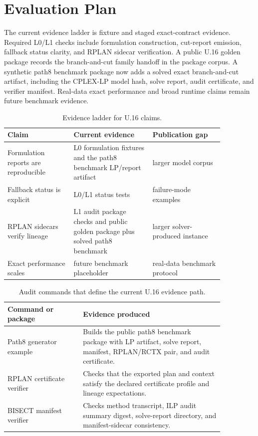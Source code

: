 \section{Evaluation Plan}

The current evidence ladder is fixture and staged exact-contract evidence.
Required L0/L1 checks include formulation construction, cut-report emission,
fallback status clarity, and RPLAN sidecar verification. A public U.16 golden
package records the branch-and-cut family handoff in the package corpus. A
synthetic path8 benchmark package now adds a solved exact branch-and-cut
artifact, including the CPLEX-LP model hash, solve report, audit certificate,
and verifier manifest. Real-data exact performance and broad runtime claims
remain future benchmark evidence.

\begin{table}[htbp]
\centering
\small
\begin{tabular}{p{0.26\linewidth}p{0.31\linewidth}p{0.29\linewidth}}
\toprule
Claim & Current evidence & Publication gap \\
\midrule
Formulation reports are reproducible & L0 formulation fixtures and the path8
benchmark LP/report artifact & larger model corpus \\
Fallback status is explicit & L0/L1 status tests & failure-mode examples \\
RPLAN sidecars verify lineage & L1 audit package checks and public golden
package plus solved path8 benchmark & larger solver-produced instance \\
Exact performance scales & future benchmark placeholder & real-data benchmark protocol \\
\bottomrule
\end{tabular}
\caption{Evidence ladder for U.16 claims.}
\end{table}

\begin{table}[htbp]
\centering
\small
\begin{tabular}{p{0.30\linewidth}p{0.56\linewidth}}
\toprule
Command or package & Evidence produced \\
\midrule
Path8 generator example
& Builds the public path8 benchmark package with LP artifact, solve report,
manifest, RPLAN/RCTX pair, and audit certificate. \\
RPLAN certificate verifier
& Checks that the exported plan and context satisfy the declared certificate
profile and lineage expectations. \\
BISECT manifest verifier
& Checks method transcript, ILP audit summary digest, solve-report directory,
and manifest-sidecar consistency. \\
\bottomrule
\end{tabular}
\caption{Audit commands that define the current U.16 evidence path.}
\end{table}


